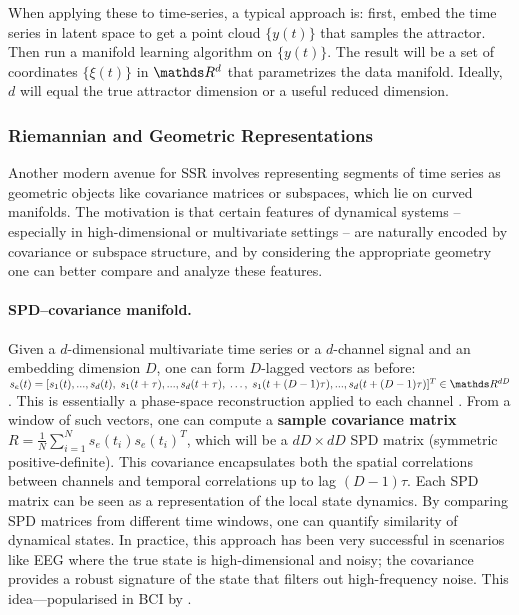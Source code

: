 \documentclass[14pt]{extarticle}
\begin{document}
	When applying these to time-series, a typical approach is: first, embed the time series in latent space to get a point cloud $\{y(t)\}$ that samples the attractor.
	Then run a manifold learning algorithm on $\{y(t)\}$.
	The result will be a set of coordinates $\{\xi(t)\}$ in $\dR^d$ that parametrizes the data manifold.
	Ideally, $d$ will equal the true attractor dimension or a useful reduced dimension.
	
	\subsubsection*{Riemannian and Geometric Representations}
	Another modern avenue for SSR involves representing segments of time series as geometric objects like covariance matrices or subspaces, which lie on curved manifolds. 
	The motivation is that certain features of dynamical systems -- especially in high-dimensional or multivariate settings -- are naturally encoded by covariance or subspace structure, and by considering the appropriate geometry one can better compare and analyze these features.
	
	\paragraph{SPD–covariance manifold.}  
	Given a $d$-dimensional multivariate time series or a $d$-channel signal and an embedding dimension $D$, one can form $D$-lagged vectors as before: $s_e(t) = [s_1(t), ..., s_d(t),\; s_1(t+\tau),...,s_d(t+\tau),\;\dots,\;s_1(t+(D-1)\tau),...,s_d(t+(D-1)\tau)]^T \in \dR^{dD}$.
	This is essentially a phase-space reconstruction applied to each channel \citep{pennec2006intrinsic}.
	From a window of such vectors, one can compute a \textbf{sample covariance matrix} $R = \frac{1}{N}\sum_{i=1}^N s_e(t_i) s_e(t_i)^T$, which will be a $dD \times dD$ SPD matrix (symmetric positive-definite).
	This covariance encapsulates both the spatial correlations between channels and temporal correlations up to lag $(D-1)\tau$.
	Each SPD matrix can be seen as a representation of the local state dynamics.
	By comparing SPD matrices from different time windows, one can quantify similarity of dynamical states.
	In practice, this approach has been very successful in scenarios like EEG where the true state is high-dimensional and noisy; the covariance provides a robust signature of the state that filters out high-frequency noise.
	This idea—popularised in BCI by \citet{barachant2013classification}.
	
\end{document}
